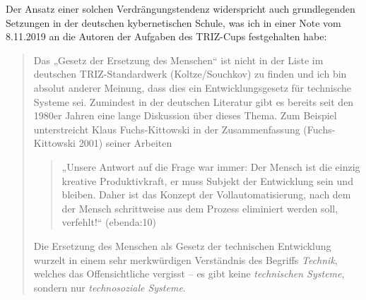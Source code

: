 \documentclass[11pt,a4paper]{article}
\begin{document}
Der Ansatz einer solchen Verdrängungstendenz widerspricht auch grundlegenden
Setzungen in der deutschen kybernetischen Schule, was ich in einer Note vom
8.11.2019 an die Autoren der Aufgaben des TRIZ-Cups festgehalten habe:
\begin{quote}
  Das „Gesetz der Ersetzung des Menschen“ ist nicht in der Liste im deutschen
  TRIZ-Standardwerk (Koltze/Souchkov) zu finden und ich bin absolut anderer
  Meinung, dass dies ein Entwicklungsgesetz für technische Systeme sei.
  Zumindest in der deutschen Literatur gibt es bereits seit den 1980er Jahren
  eine lange Diskussion über dieses Thema. Zum Beispiel unterstreicht Klaus
  Fuchs-Kittowski in der Zusammenfassung (Fuchs-Kittowski 2001) seiner
  Arbeiten
  \begin{quote}
    „Unsere Antwort auf die Frage war immer: Der Mensch ist die einzig kreative
    Produktivkraft, er muss Subjekt der Entwicklung sein und bleiben.  Daher
    ist das Konzept der Vollautomatisierung, nach dem der Mensch schrittweise
    aus dem Prozess eliminiert werden soll, verfehlt!“ (ebenda:10)
  \end{quote}
  Die Ersetzung des Menschen als Gesetz der technischen Entwicklung wurzelt in
  einem sehr merkwürdigen Verständnis des Begriffs \emph{Technik}, welches das
  Offensichtliche vergisst -- es gibt keine \emph{technischen Systeme},
  sondern nur \emph{technosoziale Systeme}.
\end{quote}
\end{document}
